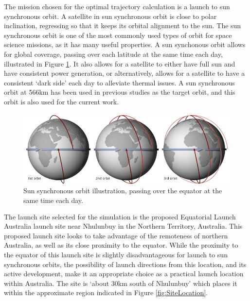 The mission chosen for the optimal trajectory calculation is a launch to sun synchronous orbit. 
A satellite in sun synchronous orbit is close to polar inclination, regressing so that it keeps its orbital alignment to the sun. The sun synchronous orbit is one of the most commonly used types of orbit for space science missions, as it has many useful properties\cite{Boain2004}. A sun synchonous orbit allows for global coverage, passing over each latitude at the same time each day, illustrated in Figure \ref{fig:SSO}. It also allows for a satellite to either have full sun and have consistent power generation, or alternatively, allows for a satellite to have a consistent `dark side' each day to alleviate thermal issues\cite{Boain2004}. A sun synchronous orbit at 566km has been used in previous studies as the target orbit\cite{Preller2017b}, and this orbit is also used for the current work. 
\begin{figure}[ht]
	\centering
	\includegraphics[width=0.8\linewidth]{figures/4_LODESTAR/SSO}
	\caption{Sun synchronous orbit illustration, passing over the equator at the same time each day\cite{NASASSO}.}
	\label{fig:SSO}
\end{figure}

The launch site selected for the simulation is the proposed Equatorial Launch Australia launch site near Nhulunbuy in the Northern Territory, Australia\cite{ELA}. This proposed launch site looks to take advantage of the remoteness of northern Australia, as well as its close proximity to the equator. While the proximity to the equator of this launch site is slightly disadvantageous for launch to sun synchronous orbits, the possibility of launch directions from this location, and its active development, make it an appropriate choice as a practical launch location within Australia. The site is `about 30km south of Nhulunbuy'\cite{ELA} which places it within the approximate region indicated in Figure \ref{fig:SiteLocation}.

